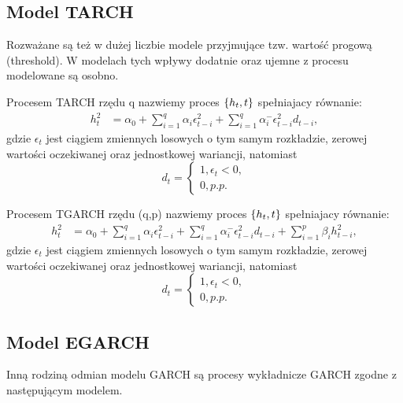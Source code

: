 \documentclass[10pt,a4paper]{book}
\begin{document}
\subsection{Model TARCH}

Rozważane są też w dużej liczbie modele przyjmujące tzw. wartość progową (threshold). W modelach tych wpływy dodatnie oraz ujemne z procesu modelowane są osobno.

\begin{definition}
Procesem TARCH rzędu q nazwiemy proces $\left\lbrace {{h_t}, {t}} \right\rbrace$ spełniajacy równanie:
\begin{align*}
h_t^2 &= \alpha_0 + \sum_{i=1}^{q} \alpha_i \epsilon^2_{t-i} + \sum_{i=1}^{q} \alpha^{-}_i \epsilon^2_{t-i} d_{t-i},
\end{align*}
gdzie $\epsilon_t$ jest ciągiem zmiennych losowych o tym samym rozkładzie, zerowej wartości oczekiwanej oraz jednostkowej wariancji, natomiast
$$
d_t = \begin{cases} 1, \epsilon_t < 0, \\ 0, p.p. \end{cases}
$$

\end{definition}

\begin{definition}
Procesem TGARCH rzędu (q,p) nazwiemy proces $\left\lbrace {{h_t}, {t}} \right\rbrace$ spełniajacy równanie:
\begin{align*}
h_t^2 &= \alpha_0 + \sum_{i=1}^{q} \alpha_i \epsilon^2_{t-i} + \sum_{i=1}^{q} \alpha^{-}_i \epsilon^2_{t-i} d_{t-i} + \sum_{i=1}^{p} \beta_{i} h_{t-i}^2,
\end{align*}
gdzie $\epsilon_t$ jest ciągiem zmiennych losowych o tym samym rozkładzie, zerowej wartości oczekiwanej oraz jednostkowej wariancji, natomiast
$$
d_t = \begin{cases} 1, \epsilon_t < 0, \\ 0, p.p. \end{cases}
$$
\end{definition}

\subsection{Model EGARCH}

Inną rodziną odmian modelu GARCH są procesy wykładnicze GARCH zgodne z następującym modelem.
\end{document}

